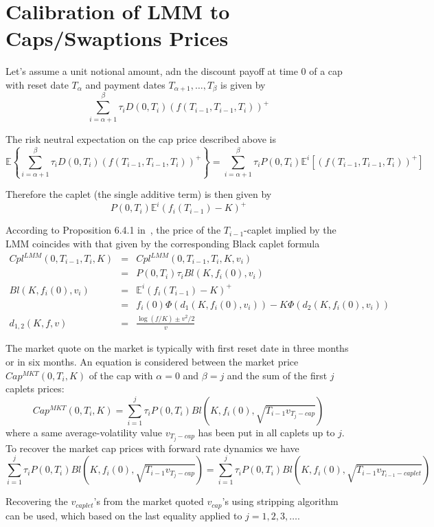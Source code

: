 \section{Calibration of LMM to Caps/Swaptions Prices}
Let's assume a unit notional amount, adn the discount payoff at time 0 of a cap with reset date $T_{\alpha}$ and payment dates $T_{\alpha+1},\ldots,T_{\beta}$ is given by
$$
\sum_{i=\alpha+1}^{\beta} \tau_i D(0,T_i)(f(T_{i-1},T_{i-1},T_{i}))^+
$$

The risk neutral expectation on the cap price described above is
$$
\mathbb{E} \left\{ \sum_{i=\alpha+1}^{\beta} \tau_i D(0,T_i)(f(T_{i-1},T_{i-1},T_{i}))^+ \right\} = \sum_{i=\alpha+1}^{\beta} \tau_i P(0,T_i) \mathbb{E}^i[(f(T_{i-1},T_{i-1},T_{i}))^+]
$$

Therefore the caplet (the single additive term) is then given by
$$
P(0,T_i)\mathbb{E}^i(f_i(T_{i-1})-K)^+
$$

According to Proposition 6.4.1 in~\cite{bm06}, the price of the $T_{i-1}$-caplet implied by the LMM coincides with that given by the corresponding Black caplet formula
\begin{eqnarray*}
Cpl^{LMM}(0,T_{i-1},T_i,K)  &=& Cpl^{LMM}(0,T_{i-1},T_i,K,v_i) \\
                            &=& P(0,T_i)\tau_i Bl(K,f_i(0),v_i) \\
            Bl(K,f_i(0),v_i) &=& \mathbb{E}^i (f_i(T_{i-1})-K)^+ \\
                            &=& f_i(0) \Phi(d_1(K,f_i(0), v_i)) - K \Phi(d_2(K,f_i(0), v_i)) \\
            d_{1,2}(K,f,v)  &=& \frac{\log(f/K) \pm v^2/2}{v}
\end{eqnarray*}

The market quote on the market is typically with first reset date in three months or in six months. An equation is considered between the market price $Cap^{MKT}(0,T_i,K)$ of the cap with $\alpha=0$ and $\beta=j$ and the sum of the first $j$ caplets prices:
$$
Cap^{MKT}(0,T_i,K) = \sum_{i=1}^{j} \tau_i P(0,T_i) Bl(K,f_i(0),\sqrt{T_{i-1} v_{T_j-cap}})
$$
where a same average-volatility value $v_{T_j-cap}$ has been put in all caplets up to $j$. To recover the market cap prices with  forward rate dynamics we have
$$
\sum_{i=1}^{j} \tau_i P(0,T_i) Bl(K,f_i(0),\sqrt{T_{i-1} v_{T_j-cap}}) = \sum_{i=1}^{j} \tau_i P(0,T_i) Bl(K,f_i(0),\sqrt{T_{i-1} v_{T_{i-1}-caplet}})
$$

Recovering the $v_{caplet}$'s from the market quoted $v_{cap}$'s using stripping algorithm can be used, which based on the last equality applied to $j=1,2,3,\ldots$.

